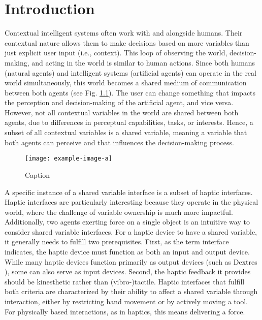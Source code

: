 \chapter{Introduction}
\label{ch:shared:introduction}
Contextual intelligent systems often work with and alongside humans. Their contextual nature allows them to make decisions based on more variables than just explicit user input (i.e., context). This loop of observing the world, decision-making, and acting in the world is similar to human actions. Since both humans (natural agents) and intelligent systems (artificial agents) can operate in the real world simultaneously, this world becomes a shared medium of communication between both agents (see Fig. \ref{fig:enter-label}). The user can change something that impacts the perception and decision-making of the artificial agent, and vice versa. However, not all contextual variables in the world are shared between both agents, due to differences in perceptual capabilities, tasks, or interests. Hence, a subset of all contextual variables is a shared variable, meaning a variable that both agents can perceive and that influences the decision-making process.

\begin{figure}
    \centering
    \texttt{[image: example-image-a]}
    \caption{Caption}
    \label{fig:enter-label}
\end{figure}

A specific instance of a shared variable interface is a subset of haptic interfaces. Haptic interfaces are particularly interesting because they operate in the physical world, where the challenge of variable ownership is much more impactful. Additionally, two agents exerting force on a single object is an intuitive way to consider shared variable interfaces. For a haptic device to have a shared variable, it generally needs to fulfill two prerequisites. First, as the term interface indicates, the haptic device must function as both an input and output device. While many haptic devices function primarily as output devices (such as Dextres \cite{hinchet2018dextres}), some can also serve as input devices. Second, the haptic feedback it provides should be kinesthetic rather than (vibro-)tactile. Haptic interfaces that fulfill both criteria are characterized by their ability to affect a shared variable through interaction, either by restricting hand movement or by actively moving a tool. For physically based interactions, as in haptics, this means delivering a force.

